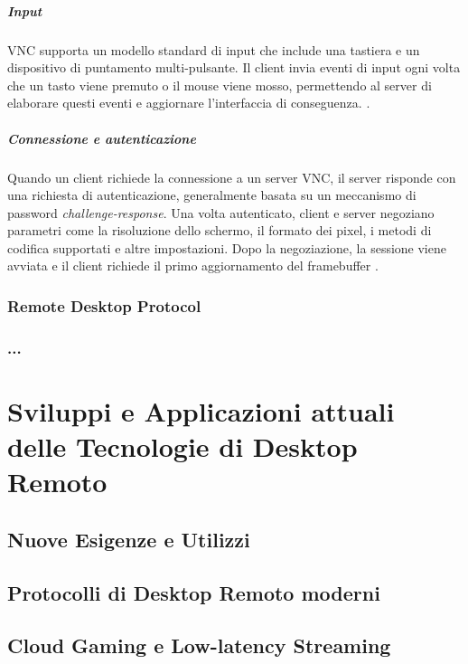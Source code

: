 \documentclass[12pt,a4paper,openright,twoside]{book}
\begin{document}
\paragraph{Input}

VNC supporta un modello standard di input che include una tastiera e un dispositivo di puntamento multi-pulsante. Il client invia eventi di input ogni volta che un tasto viene premuto o il mouse viene mosso, permettendo al server di elaborare questi eventi e aggiornare l'interfaccia di conseguenza. \cite{richardson1998vnc}.

\paragraph{Connessione e autenticazione}

Quando un client richiede la connessione a un server VNC, il server risponde con una richiesta di autenticazione, generalmente basata su un meccanismo di password \textit{challenge-response}. Una volta autenticato, client e server negoziano parametri come la risoluzione dello schermo, il formato dei pixel, i metodi di codifica supportati e altre impostazioni. Dopo la negoziazione, la sessione viene avviata e il client richiede il primo aggiornamento del framebuffer \cite{richardson1998vnc}.

\subsection{Remote Desktop Protocol}

\subsection{...}

\chapter{Sviluppi e Applicazioni attuali delle Tecnologie di Desktop Remoto}

\section{Nuove Esigenze e Utilizzi}

\section{Protocolli di Desktop Remoto moderni}

\section{Cloud Gaming e Low-latency Streaming}
\end{document}
